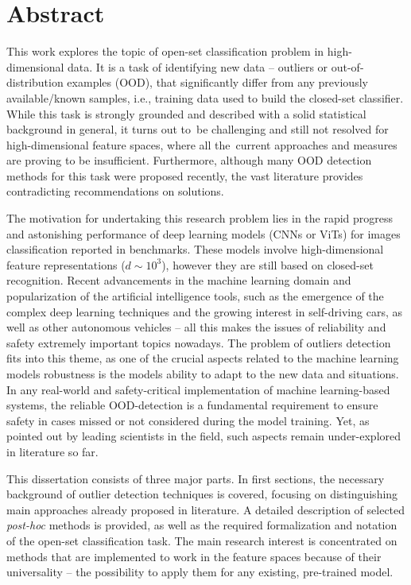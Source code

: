 
\chapter*{Abstract}
\label{chapter:abstract}

This work explores the topic of open-set classification problem in high-dimensional data. It is a task of identifying new data – outliers or out-of-distribution examples (OOD), that significantly differ from any previously available/known samples, i.e., training data used to build the closed-set classifier. While this task is strongly grounded and described with a solid statistical background in general, it turns out to~be challenging and still not resolved for high-dimensional feature spaces, where all the~current approaches and measures are proving to be insufficient. Furthermore, although many OOD detection methods for this task were proposed recently, the vast literature provides contradicting recommendations on solutions.

The motivation for undertaking this research problem lies in the rapid progress and astonishing performance of deep learning models (CNNs or ViTs) for images classification reported in benchmarks. These models involve high-dimensional feature representations ($d \sim 10^3$), however they are still based on closed-set recognition. Recent advancements in the machine learning domain and popularization of the artificial intelligence tools, such as the emergence of the complex deep learning techniques and the growing interest in self-driving cars, as well as other autonomous vehicles – all this makes the issues of reliability and safety extremely important topics nowadays. The problem of outliers detection fits into this theme, as one of the crucial aspects related to the machine learning models robustness is the models ability to adapt to the new data and situations. In any real-world and safety-critical implementation of machine learning-based systems, the reliable OOD-detection is a fundamental requirement to ensure safety in cases missed or not considered during the model training. Yet, as pointed out by leading scientists in the field, such aspects remain under-explored in literature so far.

This dissertation consists of three major parts. In first sections, the necessary background of outlier detection techniques is covered, focusing on distinguishing main approaches already proposed in literature. A detailed description of selected \textit{post-hoc} methods is provided, as well as the required formalization and notation of the open-set classification task. The main research interest is concentrated on methods that are implemented to work in the feature spaces because of their universality – the possibility to apply them for any existing, pre-trained model.

